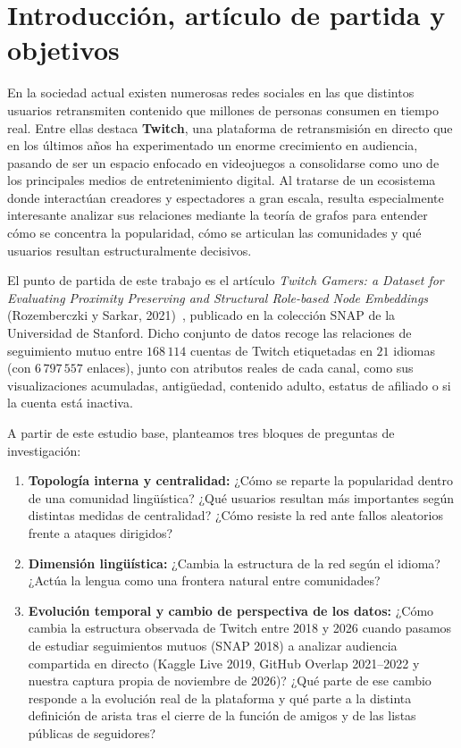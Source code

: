 \documentclass[11pt,a4paper]{article}
\begin{document}
\tableofcontents
\newpage
{}

\section{Introducción, artículo de partida y objetivos}

En la sociedad actual existen numerosas redes sociales en las que distintos usuarios retransmiten contenido que millones de personas consumen en tiempo real. Entre ellas destaca \textbf{Twitch}, una plataforma de retransmisión en directo que en los últimos años ha experimentado un enorme crecimiento en audiencia, pasando de ser un espacio enfocado en videojuegos a consolidarse como uno de los principales medios de entretenimiento digital. Al tratarse de un ecosistema donde interactúan creadores y espectadores a gran escala, resulta especialmente interesante analizar sus relaciones mediante la teoría de grafos para entender cómo se concentra la popularidad, cómo se articulan las comunidades y qué usuarios resultan estructuralmente decisivos.

El punto de partida de este trabajo es el artículo \textit{Twitch Gamers: a Dataset for Evaluating Proximity Preserving and Structural Role-based Node Embeddings} (Rozemberczki y Sarkar, 2021)~\cite{rozemberczki2021}, publicado en la colección SNAP de la Universidad de Stanford. Dicho conjunto de datos recoge las relaciones de seguimiento mutuo entre $168\,114$ cuentas de Twitch etiquetadas en $21$ idiomas (con $6\,797\,557$ enlaces), junto con atributos reales de cada canal, como sus visualizaciones acumuladas, antigüedad, contenido adulto, estatus de afiliado o si la cuenta está inactiva.

A partir de este estudio base, planteamos tres bloques de preguntas de investigación:
\begin{enumerate}[leftmargin=*, itemsep=2pt]
  \item \textbf{Topología interna y centralidad:} ¿Cómo se reparte la popularidad dentro de una comunidad lingüística? ¿Qué usuarios resultan más importantes según distintas medidas de centralidad? ¿Cómo resiste la red ante fallos aleatorios frente a ataques dirigidos?
  \item \textbf{Dimensión lingüística:} ¿Cambia la estructura de la red según el idioma? ¿Actúa la lengua como una frontera natural entre comunidades?
  \item \textbf{Evolución temporal y cambio de perspectiva de los datos:} ¿Cómo cambia la estructura observada de Twitch entre 2018 y 2026 cuando pasamos de estudiar seguimientos mutuos (SNAP 2018) a analizar audiencia compartida en directo (Kaggle Live 2019, GitHub Overlap 2021--2022 y nuestra captura propia de noviembre de 2026)? ¿Qué parte de ese cambio responde a la evolución real de la plataforma y qué parte a la distinta definición de arista tras el cierre de la función de amigos y de las listas públicas de seguidores?
\end{enumerate}
\end{document}
